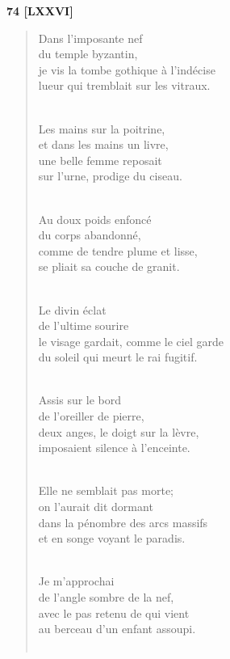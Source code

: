 \documentclass[a4paper,12pt]{book}
\begin{document}
\bigskip

\begin{center} {\bf 74 [LXXVI]} \end{center}

\begin{verse}
Dans l'imposante nef \\
du temple byzantin, \\
je vis la tombe gothique à l'indécise \\
lueur qui tremblait sur les vitraux. \\ \

Les mains sur la poitrine, \\
et dans les mains un livre, \\
une belle femme reposait \\
sur l'urne, prodige du ciseau. \\ \

Au doux poids enfoncé \\
du corps abandonné, \\
comme de tendre plume et lisse, \\
se pliait sa couche de granit. \\ \

Le divin éclat \\
de l'ultime sourire \\
le visage gardait, comme le ciel garde \\
du soleil qui meurt le rai fugitif. \\ \

Assis sur le bord \\
de l'oreiller de pierre, \\
deux anges, le doigt sur la lèvre, \\
imposaient silence à l'enceinte. \\ \

Elle ne semblait pas morte; \\
on l'aurait dit dormant \\
dans la pénombre des arcs massifs \\
et en songe voyant le paradis. \\ \

Je m'approchai \\
de l'angle sombre de la nef, \\
avec le pas retenu de qui vient \\
au berceau d'un enfant assoupi. \\ \


\end{verse}
\end{document}
